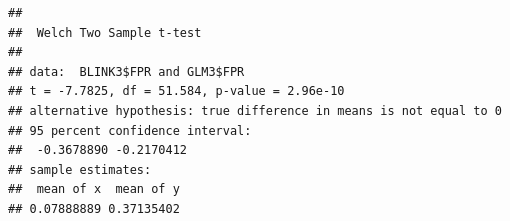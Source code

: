 \documentclass[
]{article}
\newenvironment{Shaded}{\begin{snugshade}}{\end{snugshade}}
\newcommand{\CommentTok}[1]{\textcolor[rgb]{0.56,0.35,0.01}{\textit{#1}}}
\newcommand{\KeywordTok}[1]{\textcolor[rgb]{0.13,0.29,0.53}{\textbf{#1}}}
\newcommand{\NormalTok}[1]{#1}
\newcommand{\OperatorTok}[1]{\textcolor[rgb]{0.81,0.36,0.00}{\textbf{#1}}}
\begin{document}
\begin{Shaded}
\end{Shaded}

\begin{verbatim}
## 
##  Welch Two Sample t-test
## 
## data:  BLINK3$FPR and GLM3$FPR
## t = -7.7825, df = 51.584, p-value = 2.96e-10
## alternative hypothesis: true difference in means is not equal to 0
## 95 percent confidence interval:
##  -0.3678890 -0.2170412
## sample estimates:
##  mean of x  mean of y 
## 0.07888889 0.37135402
\end{verbatim}
\end{document}
